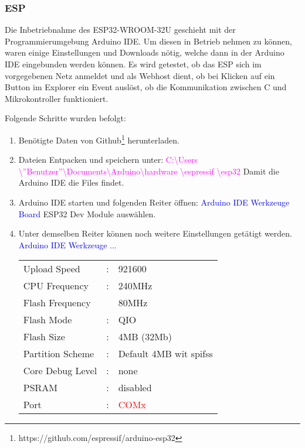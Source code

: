 \subsubsection{ESP}
\label{subsubsec:Inbetriebnahme_ESP}

Die Inbetriebnahme des ESP32-WROOM-32U geschieht mit der Programmierumgebung Arduino IDE. Um diesen in Betrieb nehmen zu können, waren einige Einstellungen und Downloads nötig, welche dann in der Arduino IDE eingebunden werden können. Es wird getestet, ob das ESP sich im vorgegebenen Netz anmeldet und als Webhost dient, ob bei Klicken auf ein Button im Explorer ein Event auslöst, ob die Kommunikation zwischen \textmu C und Mikrokontroller funktioniert.

Folgende Schritte wurden befolgt:
\begin{enumerate}
\item Benötigte Daten von Github\footnote{https://github.com/espressif/arduino-esp32} herunterladen.\newline
\item Dateien Entpacken und speichern unter:\newline
\textcolor{magenta}{C:\textbackslash Users \textbackslash ''Benutzer''\textbackslash Documents\textbackslash Arduino\textbackslash hardware \textbackslash espressif \textbackslash esp32}\newline
Damit die Arduino IDE die Files findet.\newline
\item Arduino IDE starten und folgenden Reiter öffnen:\newline
\textcolor{blue}{Arduino IDE \textrightarrow Werkzeuge \textrightarrow Board}\newline
ESP32 Dev Module auswählen.\newline
\item Unter demselben Reiter können noch weitere Einstellungen getätigt werden.\newline
\textcolor{blue}{Arduino IDE \textrightarrow Werkzeuge \textrightarrow ...}\newline
\begin{tabular}{lll}
Upload Speed & : & 921600\\
CPU Frequency & : & 240MHz\\
Flash Frequency & & 80MHz\\
Flash Mode & : & QIO\\
Flash Size & : & 4MB (32Mb)\\
Partition Scheme & : & Default 4MB wit spifss\\
Core Debug Level & : & none\\
PSRAM & : & disabled\\
Port & : & \textcolor{red}{COMx}\\
\end{tabular}


\end{enumerate}
